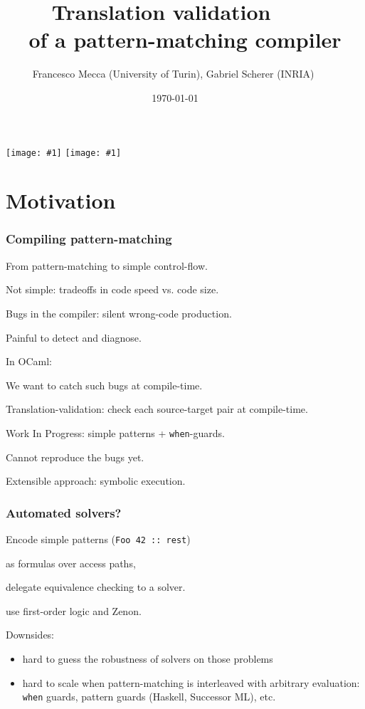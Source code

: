 \documentclass[dvipsnames]{beamer}
\title{Translation validation $\qquad$ \\ of a pattern-matching compiler $\qquad$}
\subtitle{}
\author{Francesco Mecca (University of Turin), Gabriel Scherer (INRIA) $\qquad$}
\date{\today$\qquad$}
\begin{document}

\newcommand{\showface}[1]{\texttt{[image: \#1]}}
\begin{frame}
  \titlepage

\begin{center}
  \showface{pictures/Francesco_Mecca.jpg}
  \showface{pictures/Gabriel_Scherer.jpg}
  $\qquad$
\end{center}
\end{frame}

\section{Motivation}

\begin{frame}
  \frametitle{Compiling pattern-matching}

  From pattern-matching to simple control-flow.

  Not simple: tradeoffs in code speed vs. code size.

  \vfill

  Bugs in the compiler: silent wrong-code production.

  Painful to detect and diagnose.

  \vfill

  In OCaml: %

  \vfill

  We want to catch such bugs at compile-time.

  Translation-validation: check each source-target pair at compile-time.

  \vfill

  \alert{Work In Progress}: simple patterns + \texttt{when}-guards.

  Cannot reproduce the bugs yet.

  Extensible approach: symbolic execution.
\end{frame}

\begin{frame}
  \frametitle{Automated solvers?}

  Encode simple patterns (\lstinline{Foo 42 :: rest})

  as formulas over access paths,

  delegate equivalence checking to a solver.

  \vfill

  \citet*{tom} use first-order logic and Zenon.

  \vfill

  Downsides:
  \begin{itemize}
  \item hard to guess the robustness of solvers on those problems
  \item hard to scale when pattern-matching is interleaved with arbitrary evaluation:
    \texttt{when} guards, pattern guards (Haskell, Successor ML), etc.
  \end{itemize}

  \vfill\vfill

  
\end{frame}
\end{document}
